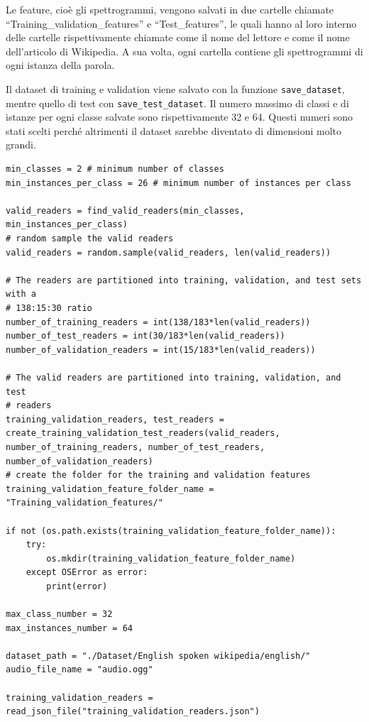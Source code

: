 \documentclass[12pt,a4paper,titlepage]{article}
\begin{document}
Le feature, cioè gli spettrogrammi, vengono salvati in due cartelle chiamate ``Training\_validation\_features'' e ``Test\_features'', le quali hanno al loro interno delle cartelle rispettivamente chiamate come il nome del lettore e come il nome dell'articolo di Wikipedia. A sua volta, ogni cartella contiene gli spettrogrammi di ogni istanza della parola.

Il dataset di training e validation viene salvato con la funzione \texttt{save\_dataset}, mentre quello di test con \texttt{save\_test\_dataset}. Il numero massimo di classi e di istanze per ogni classe salvate sono rispettivamente 32 e 64. Questi numeri sono stati scelti perché altrimenti il dataset sarebbe diventato di dimensioni molto grandi.

\begin{lstlisting}[language=iPython,firstnumber=262, caption=preprocessing.py, label=preprocessing,captionpos=b]
min_classes = 2 # minimum number of classes
min_instances_per_class = 26 # minimum number of instances per class

valid_readers = find_valid_readers(min_classes, min_instances_per_class)
# random sample the valid readers
valid_readers = random.sample(valid_readers, len(valid_readers))

# The readers are partitioned into training, validation, and test sets with a 
# 138:15:30 ratio
number_of_training_readers = int(138/183*len(valid_readers))
number_of_test_readers = int(30/183*len(valid_readers))
number_of_validation_readers = int(15/183*len(valid_readers))

# The valid readers are partitioned into training, validation, and test
# readers 
training_validation_readers, test_readers = create_training_validation_test_readers(valid_readers, number_of_training_readers, number_of_test_readers, number_of_validation_readers)
# create the folder for the training and validation features
training_validation_feature_folder_name = "Training_validation_features/"

if not (os.path.exists(training_validation_feature_folder_name)):
    try:
        os.mkdir(training_validation_feature_folder_name)
    except OSError as error:
        print(error)   

max_class_number = 32
max_instances_number = 64

dataset_path = "./Dataset/English spoken wikipedia/english/"
audio_file_name = "audio.ogg"

training_validation_readers = read_json_file("training_validation_readers.json")


\end{lstlisting}
\end{document}
